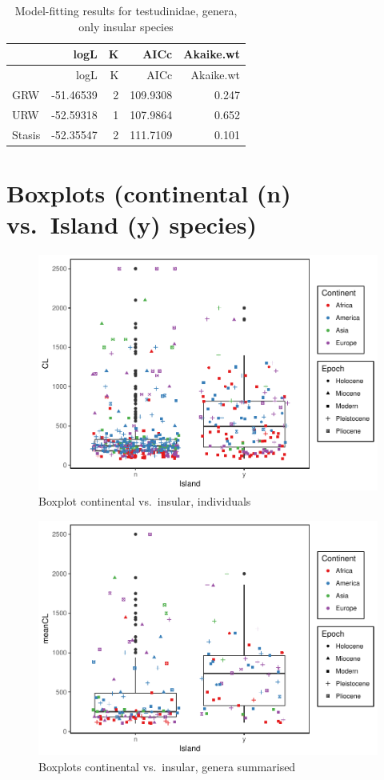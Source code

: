 \documentclass[]{article}
\begin{document}
\begin{longtable}[]{@{}lrrrr@{}}
\caption{Model-fitting results for testudinidae, genera, only insular
species}\tabularnewline
\toprule
& logL & K & AICc & Akaike.wt\tabularnewline
\midrule
\endfirsthead
\toprule
& logL & K & AICc & Akaike.wt\tabularnewline
\midrule
\endhead
GRW & -51.46539 & 2 & 109.9308 & 0.247\tabularnewline
URW & -52.59318 & 1 & 107.9864 & 0.652\tabularnewline
Stasis & -52.35547 & 2 & 111.7109 & 0.101\tabularnewline
\bottomrule
\end{longtable}

\newpage

\section{Boxplots (continental (n) vs.~Island (y)
species)}\label{boxplots-continental-n-vs.island-y-species}

\begin{figure}[htbp]
\centering
\includegraphics{MA_JJ_files/figure-latex/Boxplot continental vs. insular, individuals-1.pdf}
\caption{Boxplot continental vs.~insular, individuals}
\end{figure}

\begin{figure}[htbp]
\centering
\includegraphics{MA_JJ_files/figure-latex/Boxplots, genera summarised-1.pdf}
\caption{Boxplots continental vs.~insular, genera summarised}
\end{figure}
\end{document}
